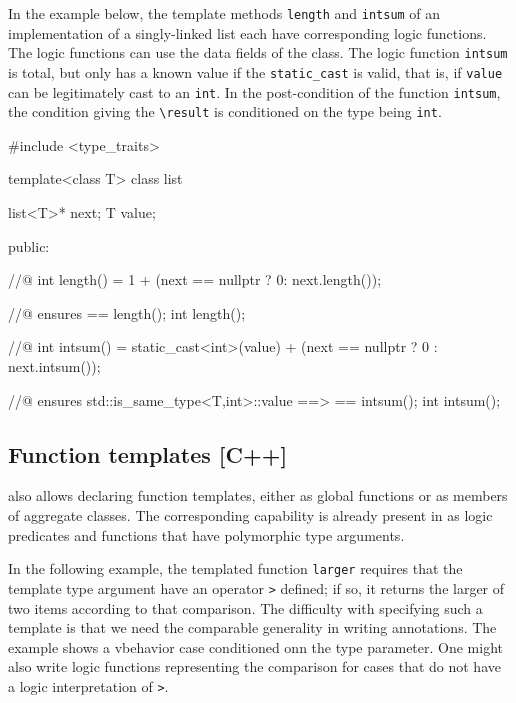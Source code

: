 In the example below, the template methods \lstinline|length| and \lstinline|intsum| of an implementation of a singly-linked list each have corresponding logic functions. The logic functions can use the data fields of the class. The logic function \lstinline|intsum| is total, but only has a known value if the \lstinline|static_cast| is valid, that is, if \lstinline|value| can be legitimately cast to an \lstinline|int|. In the post-condition of the \lang function \lstinline|intsum|, the condition giving the \lstinline|\result| is conditioned on the type being \lstinline|int|.
\begin{example}
 
\begin{listing-nonumber}
#include <type_traits>

template<class T> class list {
  list<T>* next;
  T value;
  
public:

  //@ int length() = 1 + (next == nullptr ? 0: next.length());

  //@ ensures \result == length();
  int length();
  
  //@ int intsum() =  static_cast<int>(value) + (next == nullptr ? 0 : next.intsum());
  
  //@ ensures std::is_same_type<T,int>::value ==> \result == intsum();
  int intsum();
  
}
\end{listing-nonumber}

\end{example} 

\subsection{Function templates [C++]}

\lang also allows declaring function templates, either as global functions or as members of aggregate classes. The corresponding capability is already present in \NAME as logic predicates and functions that have polymorphic type arguments.

In the following example, the templated function \lstinline|larger| requires that the template type argument have an operator \lstinline|>| defined; if so, it returns the larger of two items according to that comparison. The difficulty with specifying such a template is that we need the comparable generality in writing \NAME annotations. The example shows a vbehavior case conditioned onn the type parameter. One might also write logic functions representing the comparison for cases that do not have a logic interpretation of \lstinline|>|.

